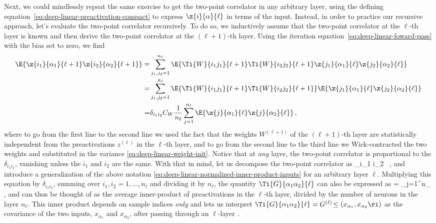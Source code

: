 Next, we could mindlessly repeat the same exercise to get the two-point correlator in any arbitrary layer, using the defining equation~\eqref{eq:deep-linear-preactivation-compact} to express $\z{i}{\alpha}{\ell}$ in terms of the input. Instead,
in order to practice our recursive approach,
let's 
evaluate the two-point correlator recursively.
To do so, we inductively assume that the two-point correlator at the $\ell$-th layer is known and then derive the two-point correlator at the $(\ell+1)$-th layer.
Using the iteration equation~\eqref{eq:deep-linear-foward-pass} with the bias set to zero, we find
\begin{align}
\label{eq:two-point-function-deep-linear-layer-ell}
\E{\z{i_1}{\alpha_1}{\ell+1}\z{i_2}{\alpha_2}{\ell+1}}=&\sum_{j_1,j_2=1}^{n_{\ell}}\E{\Ti{W}{i_1j_1}{\ell+1}\Ti{W}{i_2j_2}{\ell+1}\z{j_1}{\alpha_1}{\ell}\z{j_2}{\alpha_2}{\ell}}\, \\
=&\sum_{j_1,j_2=1}^{n_{\ell}}\E{\Ti{W}{i_1j_1}{\ell+1}\Ti{W}{i_2j_2}{\ell+1}}\E{\z{j_1}{\alpha_1}{\ell}\z{j_2}{\alpha_2}{\ell}}\, \notag \\
=&\delta_{i_1 i_2}C_W \frac{1}{n_{\ell}}\sum_{j=1}^{n_{\ell}}\E{\z{j}{\alpha_1}{\ell}\z{j}{\alpha_2}{\ell}}\, ,\nonumber%
\end{align}
where to go from the first line to the second line we used the fact that the weights $W^{(\ell+1)}$ of the $(\ell+1)$-th layer are statistically independent from the preactivations $z^{(\ell)}$ in the $\ell$-th layer, and to go from the second line to the third line we Wick-contracted the two weights and substituted in the variance \eqref{eq:deep-linear-weight-init}. Notice that at \emph{any} layer, the two-point correlator is proportional to the  $\delta_{i_1 i_2}$, vanishing unless the  $i_1$ and $i_2$ are the same. 
With that in mind, let us decompose the two-point correlator as
\be\label{eq:deep-linear-covariance-notation}
\equiv  \delta_{i_1 i_2 }\, ,
\ee
and introduce a generalization of the above notation \eqref{eq:deep-linear-normalized-inner-product-inputs} for an arbitrary layer $\ell$.
Multiplying this equation by $\delta_{i_1i_2}$, summing over $i_1,i_2=1,\ldots,n_{\ell}$ and dividing it by $n_{\ell}$, the quantity $\Ti{G}{\alpha_1\alpha_2}{\ell}$ can also be expressed as 
\be\label{eq:deep-linear-covariance-notation-2}
= \sum_{j=1}^{n_{\ell}}\, ,
\ee
and can thus be thought of as the average inner-product of preactivations in the $\ell$-th layer, divided by the number of neurons in the layer $n_{\ell}$. 
This inner product
depends on sample indices \emph{only} and lets us interpret $\Ti{G}{\alpha_1\alpha_2}{\ell} \equiv G^{(\ell)}\!\le(x_{\alpha_1},x_{\alpha_2}\ri)$ as the covariance of the two inputs, $x_{\alpha_1}$ and $x_{\alpha_2}$, after passing through an $\ell$-layer .

